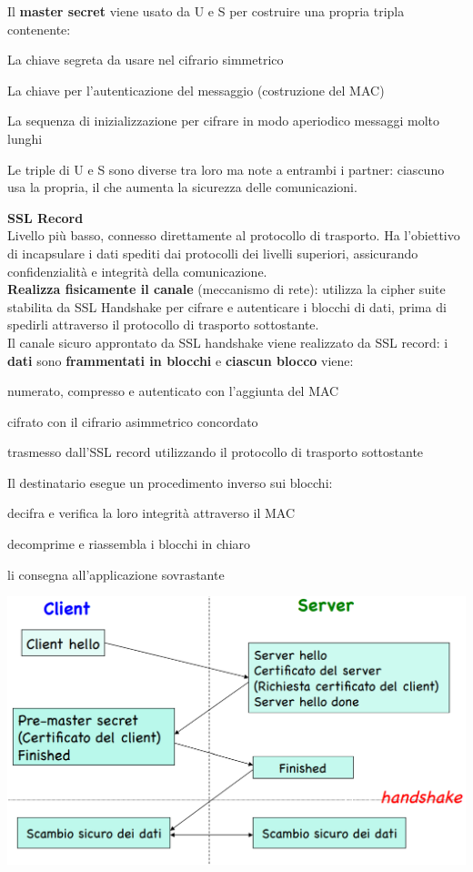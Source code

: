 \documentclass[10pt]{book}
\begin{document}
\begin{list}{}{}
	Il \textbf{master secret} viene usato da U e S per costruire una propria tripla contenente:
	\begin{list}{}{}
		\item La chiave segreta da usare nel cifrario simmetrico
		\item La chiave per l'autenticazione del messaggio (costruzione del MAC)
		\item La sequenza di inizializzazione per cifrare in modo aperiodico messaggi molto lunghi
	\end{list}
	Le triple di U e S sono diverse tra loro ma note a entrambi i partner: ciascuno usa la propria, il che aumenta la sicurezza delle comunicazioni.
	
	\item \textbf{SSL Record}\\
	Livello più basso, connesso direttamente al protocollo di trasporto. Ha l'obiettivo di incapsulare i dati spediti dai protocolli dei livelli superiori, assicurando confidenzialità e integrità della comunicazione.\\
	\textbf{Realizza fisicamente il canale} (meccanismo di rete): utilizza la cipher suite stabilita da SSL Handshake per cifrare e autenticare i blocchi di dati, prima di spedirli attraverso il protocollo di trasporto sottostante.\\
	Il canale sicuro approntato da SSL handshake viene realizzato da SSL record: i \textbf{dati} sono \textbf{frammentati in blocchi} e \textbf{ciascun blocco} viene:
	\begin{list}{}{}
		\item numerato, compresso e autenticato con l'aggiunta del MAC
		\item cifrato con il cifrario asimmetrico concordato
		\item trasmesso dall'SSL record utilizzando il protocollo di trasporto sottostante
	\end{list}
	Il destinatario esegue un procedimento inverso sui blocchi:
	\begin{list}{}{}
		\item decifra e verifica la loro integrità attraverso il MAC
		\item decomprime e riassembla i blocchi in chiaro
		\item li consegna all'applicazione sovrastante
	\end{list}
\end{list}
\begin{center}
	\includegraphics[scale=0.5]{20.png}
\end{center}
\end{document}

